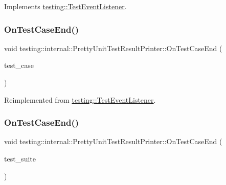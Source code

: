 Implements \mbox{\hyperlink{classtesting_1_1_test_event_listener_a468b5e6701bcb86cb2c956caadbba5e4}{testing\+::\+Test\+Event\+Listener}}.

\mbox{\label{classtesting_1_1internal_1_1_pretty_unit_test_result_printer_a7a62fe58fa6f6aace813eb62b31e5a51}} 
\subsubsection{\texorpdfstring{OnTestCaseEnd()}{OnTestCaseEnd()}\hspace{0.1cm}{\footnotesize\ttfamily [1/3]}}
{\footnotesize\ttfamily void testing\+::internal\+::\+Pretty\+Unit\+Test\+Result\+Printer\+::\+On\+Test\+Case\+End (\begin{DoxyParamCaption}\item[{const \mbox{\hyperlink{classtesting_1_1_test_case}{Test\+Case}} \&}]{test\+\_\+case }\end{DoxyParamCaption})\hspace{0.3cm}{\ttfamily [virtual]}}



Reimplemented from \mbox{\hyperlink{classtesting_1_1_test_event_listener_a6cada1572dde8010b94f6dd237ce52f4}{testing\+::\+Test\+Event\+Listener}}.

\mbox{\label{classtesting_1_1internal_1_1_pretty_unit_test_result_printer_a4d5d603ee674a7929c6361c0fbcb695d}} 
\subsubsection{\texorpdfstring{OnTestCaseEnd()}{OnTestCaseEnd()}\hspace{0.1cm}{\footnotesize\ttfamily [2/3]}}
{\footnotesize\ttfamily void testing\+::internal\+::\+Pretty\+Unit\+Test\+Result\+Printer\+::\+On\+Test\+Case\+End (\begin{DoxyParamCaption}\item[{const \mbox{\hyperlink{classtesting_1_1_test_suite}{Test\+Suite}} \&}]{test\+\_\+suite }\end{DoxyParamCaption})\hspace{0.3cm}{\ttfamily [override]}}

